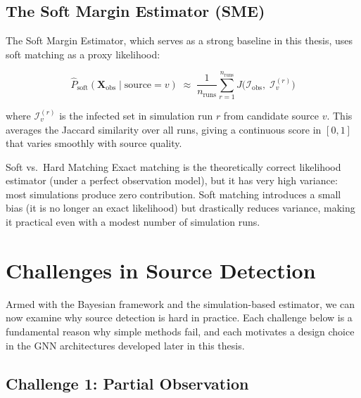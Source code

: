 \subsection{The Soft Margin Estimator (SME)}

The Soft Margin Estimator, which serves as a strong baseline in this
thesis, uses soft matching as a proxy likelihood:

\[
    \hat{P}_{\text{soft}}(\mathbf{X}_{\text{obs}} \mid \text{source}=v)
    \;\approx\; \frac{1}{n_{\text{runs}}}
    \sum_{r=1}^{n_{\text{runs}}} J\!\bigl(\mathcal{I}_{\text{obs}},\;
    \mathcal{I}^{(r)}_v\bigr)
\]

where $\mathcal{I}^{(r)}_v$ is the infected set in simulation run $r$ from
candidate source $v$. This averages the Jaccard similarity over all runs,
giving a continuous score in $[0,1]$ that varies smoothly with source
quality.

\begin{keyinsight}{Soft vs.\ Hard Matching}
Exact matching is the theoretically correct likelihood estimator (under a
perfect observation model), but it has very high variance: most simulations
produce zero contribution. Soft matching introduces a small bias (it is no
longer an exact likelihood) but drastically reduces variance, making it
practical even with a modest number of simulation runs.
\end{keyinsight}

\section{Challenges in Source Detection}
\label{sec:challenges}

Armed with the Bayesian framework and the simulation-based estimator, we can
now examine why source detection is hard in practice. Each challenge below
is a fundamental reason why simple methods fail, and each motivates a design
choice in the GNN architectures developed later in this thesis.

\subsection{Challenge 1: Partial Observation}

